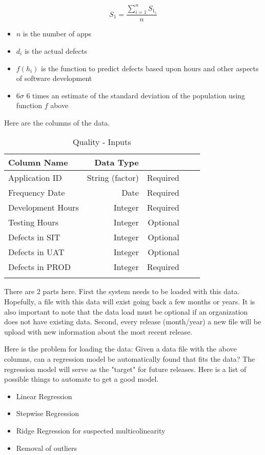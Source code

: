 \documentclass[SDSUThesis.tex]{subfiles}
\begin{document}
\[
    S_{1} = \frac{\sum^n_{i=1} S_{1_i}}{n}
\]
\begin{itemize}
\item $n$ is the number of apps
\item $d_i$ is the actual defects
\item $f(h_i)$ is the function to predict defects based upon hours and other aspects of software development
\item $6\sigma$ 6 times an estimate of the standard deviation of the population using function $f$ above
\end{itemize}

Here are the columns of the data.

\begin{longtable}{@{}l rr rr}

\toprule%
 \centering%
 {\bfseries Column Name}
 & {\bfseries Data Type}
 &  \\

\cmidrule[0.4pt](r{0.125em}){1-1}%
\cmidrule[0.4pt](lr{0.125em}){2-2}%
\cmidrule[0.4pt](l{0.125em}){3-3}%
\endhead

Application ID & String (factor) & Required \\
\myrowcolour%
Frequency Date & Date & Required \\
Development Hours & Integer & Required \\
\myrowcolour%
Testing Hours & Integer & Optional \\ 
Defects in SIT & Integer & Optional \\ 
\myrowcolour%
Defects in UAT & Integer  & Optional \\ 
Defects in PROD & Integer  & Required \\

\bottomrule

\caption{Quality - Inputs}
\label{tab:quality}
\end{longtable}


There are 2 parts here.  First the system needs to be loaded with this data.  Hopefully,
a file with this data will exist going back a few months or years.  It is also important
to note that the data load must be optional if an organization does not have existing
data.  Second, every release (month/year) a new file will be upload with new information
about the most recent release.

Here is the problem for loading the data:
Given a data file with the above columns, can a regression model be automatically found
that fits the data?  The regression model will serve as the "target" for future 
releases.  Here is a list of possible things to automate to get a good model.
\begin{itemize}
\item Linear Regression
\item Stepwise Regression
\item Ridge Regression for suspected multicolinearity
\item Removal of outliers
\end{itemize}
\end{document}
